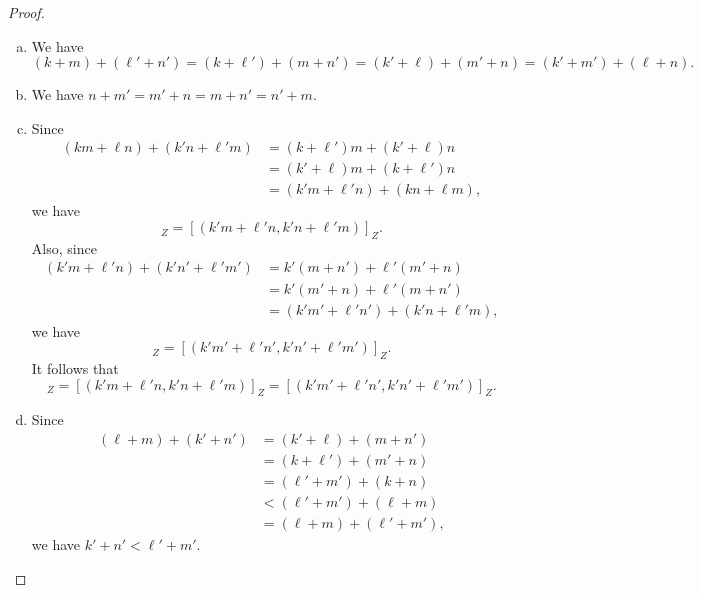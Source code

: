 \documentclass[11pt]{article}
\begin{document}
\begin{proof}
  \leavevmode
  \begin{enumerate}[(a)]
    \item We have
    \begin{equation*}
      (k + m) + (\ell' + n')
      = (k + \ell') + (m + n')
      = (k' + \ell) + (m' + n)
      = (k' + m') + (\ell + n).
    \end{equation*}
    \item We have $n + m' = m' + n = m + n' = n' + m$.
    \item Since
    \begin{align*}
      (km + \ell n) + (k'n + \ell'm)
      &= (k + \ell')m + (k' + \ell)n \\
      &= (k' + \ell)m + (k + \ell')n \\
      &= (k'm + \ell'n) + (kn + \ell m),
    \end{align*}
    we have
    \begin{equation*}
      [(km + \ell n, kn + \ell m)]_Z = [(k'm + \ell'n, k'n + \ell'm)]_Z.
    \end{equation*}
    Also, since
    \begin{align*}
      (k'm + \ell'n) + (k'n' + \ell'm')
      &= k'(m + n') + \ell'(m' + n) \\
      &= k'(m' + n) + \ell'(m + n') \\
      &= (k'm' + \ell'n') + (k'n + \ell'm),
    \end{align*}
    we have
    \begin{equation*}
      [(k'm + \ell'n, k'n + \ell'm)]_Z = [(k'm' + \ell'n', k'n' + \ell'm')]_Z.
    \end{equation*}
    It follows that
    \begin{equation*}
      [(km + \ell n, kn + \ell m)]_Z = [(k'm + \ell'n, k'n + \ell'm)]_Z = [(k'm' + \ell'n', k'n' + \ell'm')]_Z.
    \end{equation*}
    \item Since
    \begin{align*}
      (\ell + m) + (k' + n')
      &= (k' + \ell) + (m + n') \\
      &= (k + \ell') + (m' + n) \\
      &= (\ell' + m') + (k + n) \\
      &< (\ell' + m') + (\ell + m) \\
      &= (\ell + m) + (\ell' + m'),
    \end{align*}
    we have $k' + n' < \ell' + m'$.
    \qedhere
  \end{enumerate}
\end{proof}
\end{document}
